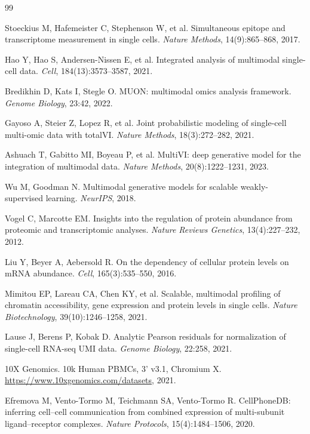 \documentclass[11pt,a4paper]{article}
\begin{document}

\begin{thebibliography}{99}

Stoeckius M, Hafemeister C, Stephenson W, et al.
Simultaneous epitope and transcriptome measurement in single cells.
\textit{Nature Methods}, 14(9):865--868, 2017.

Hao Y, Hao S, Andersen-Nissen E, et al.
Integrated analysis of multimodal single-cell data.
\textit{Cell}, 184(13):3573--3587, 2021.

Bredikhin D, Kats I, Stegle O.
MUON: multimodal omics analysis framework.
\textit{Genome Biology}, 23:42, 2022.

Gayoso A, Steier Z, Lopez R, et al.
Joint probabilistic modeling of single-cell multi-omic data with totalVI.
\textit{Nature Methods}, 18(3):272--282, 2021.

Ashuach T, Gabitto MI, Boyeau P, et al.
MultiVI: deep generative model for the integration of multimodal data.
\textit{Nature Methods}, 20(8):1222--1231, 2023.

Wu M, Goodman N.
Multimodal generative models for scalable weakly-supervised learning.
\textit{NeurIPS}, 2018.

Vogel C, Marcotte EM.
Insights into the regulation of protein abundance from proteomic and transcriptomic analyses.
\textit{Nature Reviews Genetics}, 13(4):227--232, 2012.

Liu Y, Beyer A, Aebersold R.
On the dependency of cellular protein levels on mRNA abundance.
\textit{Cell}, 165(3):535--550, 2016.

Mimitou EP, Lareau CA, Chen KY, et al.
Scalable, multimodal profiling of chromatin accessibility, gene expression and protein levels in single cells.
\textit{Nature Biotechnology}, 39(10):1246--1258, 2021.

Lause J, Berens P, Kobak D.
Analytic Pearson residuals for normalization of single-cell RNA-seq UMI data.
\textit{Genome Biology}, 22:258, 2021.

10X Genomics.
10k Human PBMCs, 3' v3.1, Chromium X.
\url{https://www.10xgenomics.com/datasets}, 2021.

Efremova M, Vento-Tormo M, Teichmann SA, Vento-Tormo R.
CellPhoneDB: inferring cell--cell communication from combined expression of multi-subunit ligand--receptor complexes.
\textit{Nature Protocols}, 15(4):1484--1506, 2020.


\end{thebibliography}
\end{document}
